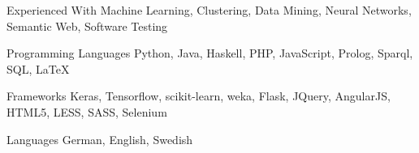 \begin{cvskills}
	\cvskill
	{Experienced With}
	{Machine Learning, Clustering, Data Mining, Neural Networks, Semantic Web, Software Testing}

	\cvskill
	{Programming Languages} %
	{Python, Java, Haskell, PHP, JavaScript, Prolog, Sparql, SQL, LaTeX} %

	\cvskill
	{Frameworks} %
	{Keras, Tensorflow, scikit-learn, weka, Flask, JQuery, AngularJS, HTML5, LESS, SASS, Selenium} %

	\cvskill
	{Languages} %
	{German, English, Swedish} %

\end{cvskills}
